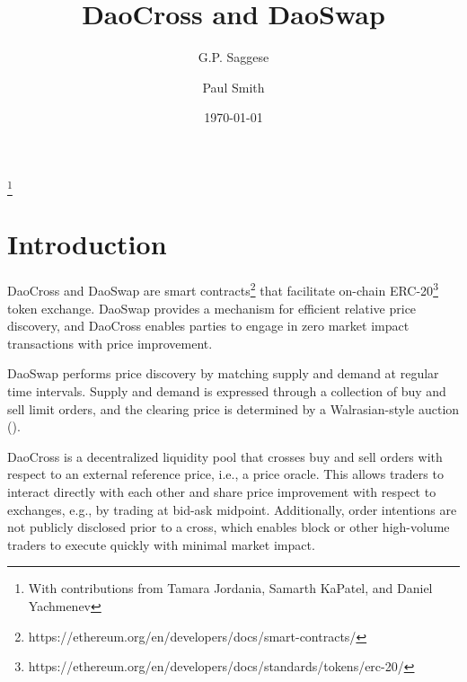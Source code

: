 \documentclass[11pt, reqno]{amsart}
\begin{document}
\title{DaoCross and DaoSwap}

\author{G.P. Saggese}
\author{Paul Smith}

\thanks{With contributions from Tamara Jordania, Samarth KaPatel, and Daniel Yachmenev}

\date{\today}

\maketitle

\tableofcontents



\section{Introduction}
DaoCross and DaoSwap are smart
contracts\footnote{https://ethereum.org/en/developers/docs/smart-contracts/}
that facilitate on-chain
ERC-20\footnote{https://ethereum.org/en/developers/docs/standards/tokens/erc-20/}
token exchange. DaoSwap provides a mechanism for efficient relative price
discovery, and DaoCross enables parties to engage in zero market impact
transactions with price improvement.

DaoSwap performs price discovery by matching supply and demand at regular time
intervals. Supply and demand is expressed through a collection of buy and sell
limit orders, and the clearing price is determined by a Walrasian-style
auction (\cite{Wa}).

DaoCross is a decentralized liquidity pool that crosses buy and sell orders
with respect to an external reference price, i.e., a price oracle. This allows
traders to interact directly with each other and share price improvement with
respect to exchanges, e.g., by trading at bid-ask midpoint. Additionally, order
intentions are not publicly disclosed prior to a cross, which enables block or
other high-volume traders to execute quickly with minimal market impact.
\end{document}
